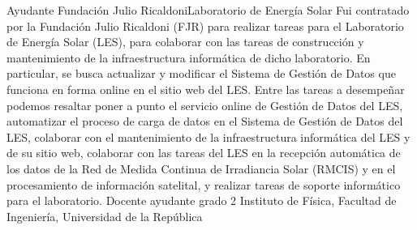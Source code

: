 \documentclass[11pt,a4paper]{moderncv}
\begin{document}
        {Ayudante}{}
        {Fundación Julio Ricaldoni}{Laboratorio de Energía Solar}
        {Fui contratado por la Fundación Julio Ricaldoni (FJR) para realizar tareas para el Laboratorio de Energía Solar (LES), para colaborar con las tareas de construcción y mantenimiento de la infraestructura informática de dicho laboratorio. En particular, se busca actualizar y modificar el Sistema de Gestión de Datos que funciona en forma online en el sitio web del LES.
        \newline{}
        Entre las tareas a desempeñar podemos resaltar poner a punto el servicio online de Gestión de Datos del LES, automatizar el proceso de carga de datos en el Sistema de Gestión de Datos del LES, colaborar con el mantenimiento de la infraestructura informática del LES y de su sitio web, colaborar con las tareas del LES en la recepción automática de los datos de la Red de Medida Continua de Irradiancia Solar (RMCIS) y en el procesamiento de información satelital, y realizar tareas de soporte informático para el laboratorio.
        }
\cvline{}{}
        {Docente ayudante grado 2}{}
        {Instituto de Física, Facultad de Ingeniería, Universidad de la República}{}
\end{document}
